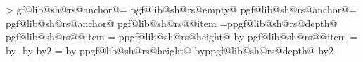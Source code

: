 {{            \pgfmathloop%
                \ifnum\pgfmathcounter>\parts%
                \else%
                    \pgf@lib@sh@getalpha\pgf@lib@sh@rs@number{\pgfmathcounter}%
                    \expandafter\let\csname pgf@lib@sh@rs@anchor@\pgf@lib@sh@rs@number\endcsname=\pgfutil@empty%
                    \expandafter\ifx\csname pgf@lib@sh@rs@empty@\pgf@lib@sh@rs@number\endcsname\pgfutil@empty%
                        \ifpgfrectanglesplitignoreemptyparts%
                            \expandafter\let\csname pgf@lib@sh@rs@anchor@\pgf@lib@sh@rs@number\endcsname=%
                                \pgf@lib@sh@rs@lastanchor%
                        \fi%
                    \fi%
                    \expandafter\ifx\csname pgf@lib@sh@rs@anchor@\pgf@lib@sh@rs@number\endcsname\pgfutil@empty%
                        \expandafter\ifx\csname pgf@lib@sh@rs@\pgf@lib@sh@rs@number @item\endcsname%
                                \pgf@lib@sh@rs@bottomtext%
                            \pgf@y=\csname pgf@lib@sh@rs@depth@\pgf@lib@sh@rs@number\endcsname\relax%
                        \else%
                            \expandafter\ifx\csname pgf@lib@sh@rs@\pgf@lib@sh@rs@number @item\endcsname%
                                    \pgf@lib@sh@rs@toptext%
                                \pgf@y=-\csname pgf@lib@sh@rs@height@\pgf@lib@sh@rs@number\endcsname\relax%
                                \advance\pgf@y by\pgf@lib@sh@rs@max@totalheight\relax%
                            \else%
                                \expandafter\ifx\csname pgf@lib@sh@rs@\pgf@lib@sh@rs@number @item\endcsname%
                                        \pgf@lib@sh@rs@basetext%
                                    \pgf@y=\pgf@lib@sh@rs@max@totalheight\relax%
                                    \advance\pgf@y by-\pgfutil@tempdima%
                                    \advance\pgf@y by\pgfutil@tempdimb%
                                    \divide\pgf@y by2\relax%
                                \else%
                                    \pgf@y=\pgf@lib@sh@rs@max@totalheight\relax%
                                    \advance\pgf@y by-\csname pgf@lib@sh@rs@height@\pgf@lib@sh@rs@number\endcsname\relax%
                                    \advance\pgf@y by\csname pgf@lib@sh@rs@depth@\pgf@lib@sh@rs@number\endcsname\relax%
                                    \divide\pgf@y by2\relax%
                                \fi%
                            \fi%
                        \fi%
}}
